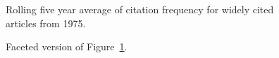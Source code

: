 \documentclass[
  10pt,
  letterpaper,
  DIV=11,
  numbers=noendperiod,
  twoside]{scrartcl}
\begin{document}
\begin{figure}


\caption{\label{fig-citation-spaghetti-1975}Rolling five year average of
citation frequency for widely cited articles from 1975.}

\end{figure}%

\begin{figure}


\caption{\label{fig-citation-facet-1975}Faceted version of
Figure~\ref{fig-citation-spaghetti-1975}.}

\end{figure}%
\end{document}
